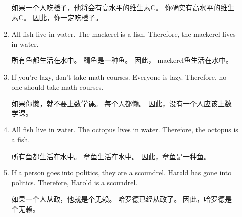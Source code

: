 \begin{enumerate}
\begin{enumerate}
  如果一个人吃橙子，他将会有高水平的维生素C。\newline
  你确实有高水平的维生素C。\newline
  因此，你一定吃橙子。
  \wbvfill
  
  \workbookpagebreak
  
  \item All fish live in water. \newline
    The mackerel is a fish. \newline
    Therefore, the mackerel lives in water. 
    
  所有鱼都生活在水中。\newline
  鲭鱼是一种鱼。\newline
  因此， mackerel鱼生活在水中。
    
    \wbvfill
  
  \item If you're lazy, don't take math courses.\newline
    Everyone is lazy. \newline
    Therefore, no one should take math courses.
    
  如果你懒，就不要上数学课。\newline
  每个人都懒。\newline
  因此，没有一个人应该上数学课。
    
    \wbvfill
  
  \item All fish live in water. \newline
    The octopus lives in water. \newline
    Therefore, the octopus is a fish.
  
  所有鱼都生活在水中。\newline
  章鱼生活在水中。\newline
  因此，章鱼是一种鱼。
  \wbvfill
  
  \item If a person goes into politics, they are a scoundrel.\newline
    Harold has gone into politics. \newline
    Therefore, Harold is a scoundrel. 
  
  如果一个人从政，他就是个无赖。\newline
  哈罗德已经从政了。\newline
  因此，哈罗德是个无赖。
  \end{enumerate}
  
  \wbvfill
  
  \workbookpagebreak
  

\end{enumerate}
